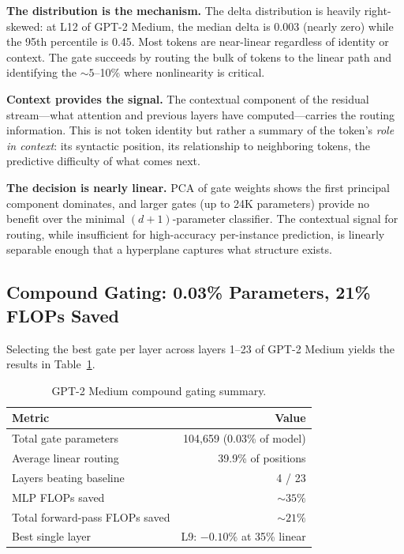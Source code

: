 \documentclass[11pt]{article}
\begin{document}
\textbf{The distribution is the mechanism.} The delta distribution is heavily right-skewed: at L12 of GPT-2 Medium, the median delta is 0.003 (nearly zero) while the 95th percentile is 0.45. Most tokens are near-linear regardless of identity or context. The gate succeeds by routing the bulk of tokens to the linear path and identifying the ${\sim}5$--10\% where nonlinearity is critical.

\textbf{Context provides the signal.} The contextual component of the residual stream---what attention and previous layers have computed---carries the routing information. This is not token identity but rather a summary of the token's \textit{role in context}: its syntactic position, its relationship to neighboring tokens, the predictive difficulty of what comes next.

\textbf{The decision is nearly linear.} PCA of gate weights shows the first principal component dominates, and larger gates (up to 24K parameters) provide no benefit over the minimal $(d+1)$-parameter classifier. The contextual signal for routing, while insufficient for high-accuracy per-instance prediction, is linearly separable enough that a hyperplane captures what structure exists.

\subsection{Compound Gating: 0.03\% Parameters, 21\% FLOPs Saved}

Selecting the best gate per layer across layers 1--23 of GPT-2 Medium yields the results in Table~\ref{tab:compound}.

\begin{table}[t]
\centering
\caption{GPT-2 Medium compound gating summary.}
\label{tab:compound}
\begin{tabular}{lr}
\toprule
Metric & Value \\
\midrule
Total gate parameters & 104,659 (0.03\% of model) \\
Average linear routing & 39.9\% of positions \\
Layers beating baseline & 4 / 23 \\
MLP FLOPs saved & ${\sim}35\%$ \\
Total forward-pass FLOPs saved & ${\sim}21\%$ \\
Best single layer & L9: $-0.10\%$ at 35\% linear \\
\bottomrule
\end{tabular}
\end{table}
\end{document}
